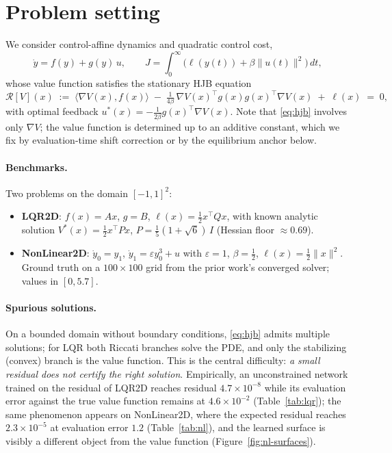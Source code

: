 \documentclass[11pt,a4paper]{article}
\begin{document}
\section{Problem setting}\label{sec:setting}

We consider control-affine dynamics and quadratic control cost,
\begin{equation}
  \dot y = f(y) + g(y)\,u, \qquad
  J = \int_0^\infty \big( \ell(y(t)) + \beta \|u(t)\|^2 \big)\,dt,
\end{equation}
whose value function satisfies the stationary HJB equation
\begin{equation}\label{eq:hjb}
  \mathcal{R}[V](x) \;:=\;
  \langle \nabla V(x), f(x)\rangle
  \;-\; \tfrac{1}{4\beta}\, \nabla V(x)^\top g(x) g(x)^\top \nabla V(x)
  \;+\; \ell(x) \;=\; 0 ,
\end{equation}
with optimal feedback $u^*(x) = -\tfrac{1}{2\beta} g(x)^\top \nabla V(x)$.
Note that \eqref{eq:hjb} involves only $\nabla V$; the value function is
determined up to an additive constant, which we fix by evaluation-time shift
correction or by the equilibrium anchor below.

\paragraph{Benchmarks.} Two problems on the domain $[-1,1]^2$:
\begin{itemize}[itemsep=1pt]
  \item \textbf{LQR2D}: $f(x)=Ax$, $g=B$, $\ell(x)=\tfrac12 x^\top Q x$,
        with known analytic solution $V^*(x) = \tfrac12 x^\top P x$,
        $P = \tfrac15(1+\sqrt6)\,I$ (Hessian floor $\approx 0.69$).
  \item \textbf{NonLinear2D}: $\dot y_0 = y_1$, $\dot y_1 = \varepsilon
        y_0^3 + u$ with $\varepsilon = 1$, $\beta = \tfrac12$,
        $\ell(x) = \tfrac12\|x\|^2$. Ground truth on a $100\times100$ grid
        from the prior work's converged solver; values in $[0, 5.7]$.
\end{itemize}

\paragraph{Spurious solutions.} On a bounded domain without boundary
conditions, \eqref{eq:hjb} admits multiple solutions; for LQR both Riccati
branches solve the PDE, and only the stabilizing (convex) branch is the
value function. This is the central difficulty: \emph{a small residual does
not certify the right solution}. Empirically, an unconstrained network
trained on the residual of LQR2D reaches residual $4.7\times10^{-8}$ while
its evaluation error against the true value function remains at
$4.6\times10^{-2}$ (Table~\ref{tab:lqr}); the same phenomenon appears on
NonLinear2D, where the expected residual reaches $2.3\times10^{-5}$ at
evaluation error $1.2$ (Table~\ref{tab:nl}), and the learned surface is
visibly a different object from the value function
(Figure~\ref{fig:nl-surfaces}).
\end{document}
